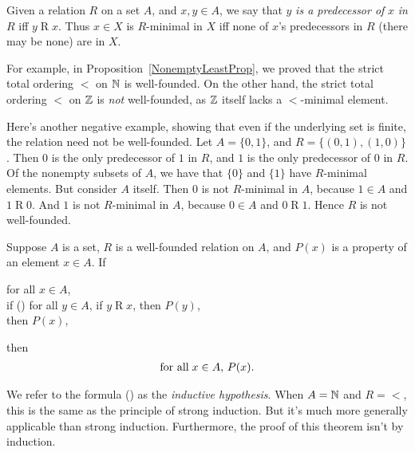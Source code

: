 Given a relation $R$ on a set $A$, and $x,y\in A$, we say that $y$
\emph{is a predecessor
%
%
%
of} $x$ \emph{in} $R$ iff $y\mathrel{R}x$.  Thus $x\in X$ is
$R$-minimal in $X$ iff none of $x$'s predecessors in $R$ (there may
be none) are in $X$.

For example, in Proposition~\ref{NonemptyLeastProp}, we proved that
the strict total ordering $<$ on $\mathbb{N}$ is well-founded.  On the other hand,
the strict total ordering $<$ on $\mathbb{Z}$ is \emph{not} well-founded, as $\mathbb{Z}$
itself lacks a $<$-minimal element.

Here's another negative example, showing that even if the underlying
set is finite, the relation need not be well-founded. Let
$A = \{0,1\}$, and $R = \{(0,1), (1,0)\}$. Then $0$ is the only
predecessor of $1$ in $R$, and $1$ is the only predecessor of $0$ in
$R$. Of the nonempty subsets of $A$, we have that $\{0\}$ and $\{1\}$
have $R$-minimal elements. But consider $A$ itself. Then $0$ is not
$R$-minimal in $A$, because $1\in A$ and $1\mathrel{R}0$. And $1$ is
not $R$-minimal in $A$, because $0\in A$ and $0\mathrel{R}1$. Hence
$R$ is not well-founded.

%
%
\begin{theorem}
Suppose $A$ is a set, $R$ is a well-founded relation on $A$, and
$P(x)$ is a property of an element $x\in A$.
If
\begin{ctabbing}
for all $x\in A$, \\
if {\rm(\dag)} for all $y\in A$, if $y\mathrel{R}x$, then $P(y)$, \\
then $P(x)$,
\end{ctabbing}
then
\begin{gather*}
\allowbreak\mbox{for all}\allowbreak\;x\in A,\,P(x) .
\end{gather*}
\end{theorem}

We refer to the formula (\dag) as the \emph{inductive hypothesis}.
%
%
When $A=\mathbb{N}$ and $R={<}$, this is the same as the principle
of strong induction.  But it's much more generally applicable than
strong induction. Furthermore, the proof of this theorem isn't
by induction.

